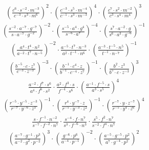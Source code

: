 \begin{align}
\left(\frac{c^{6}\cdot s^{-2}\cdot m^{-3}}{c^{-3}\cdot s^{3}\cdot m^{6}}\right)^{2}\cdot \left(\frac{c^{-3}\cdot s^{5}\cdot m^{-4}}{c^{-1}\cdot s^{3}\cdot m^{-3}}\right)^{4}\cdot \left(\frac{c^{7}\cdot s^{2}\cdot m^{-2}}{c^{3}\cdot s^{4}\cdot m^{4}}\right)^{3}
\end{align}
\begin{align}
\left(\frac{s^{-2}\cdot a^{-7}\cdot g^{-7}}{s\cdot a^{-7}\cdot g^{-2}}\right)^{-2}\cdot \left(\frac{s^{-5}\cdot a^{4}\cdot g^{4}}{s^{-6}\cdot a^{7}}\right)^{-4}\cdot \left(\frac{s^{7}\cdot a^{-2}\cdot g}{s^{6}\cdot a^{3}\cdot g^{-6}}\right)^{-1}
\end{align}
\begin{align}
\left(\frac{a^{4}\cdot t^{4}\cdot n^{2}}{a^{-2}\cdot t^{7}\cdot n^{-5}}\right)^{-2}\cdot \frac{a^{-5}\cdot t^{7}\cdot n^{-3}}{a^{2}\cdot t^{-1}\cdot n^{6}}\cdot \left(\frac{a^{-3}\cdot t^{-5}\cdot n^{5}}{t^{-1}\cdot n^{-7}}\right)^{-1}
\end{align}
\begin{align}
\left(\frac{b^{-5}\cdot c\cdot z^{7}}{c^{-3}\cdot z^{-3}}\right)^{-3}\cdot \left(\frac{b^{-1}\cdot c^{4}\cdot z}{b^{-1}\cdot c^{-4}\cdot z^{7}}\right)^{-1}\cdot \left(\frac{b^{2}\cdot z^{3}}{b^{5}\cdot c\cdot z^{-3}}\right)^{3}
\end{align}
\begin{align}
\frac{a^{-2}\cdot f^{7}\cdot s^{6}}{a^{4}\cdot f^{6}\cdot s^{2}}\cdot \frac{a^{2}\cdot f^{3}\cdot s}{f^{-4}\cdot s^{6}}\cdot \left(\frac{a^{-1}\cdot f^{-5}\cdot s}{a^{3}\cdot s^{5}}\right)^{4}
\end{align}
\begin{align}
\left(\frac{r^{-5}\cdot y^{-5}\cdot z^{-3}}{r^{-7}\cdot y^{-6}\cdot z^{3}}\right)^{-1}\cdot \left(\frac{r^{4}\cdot y^{-7}\cdot z}{r^{-5}\cdot y^{-3}\cdot z^{2}}\right)^{-1}\cdot \left(\frac{r^{-7}\cdot y\cdot z^{-7}}{r^{-5}\cdot y^{4}\cdot z^{6}}\right)^{4}
\end{align}
\begin{align}
\frac{s\cdot f^{-1}\cdot n^{-2}}{s^{-7}\cdot f^{-2}\cdot n^{7}}\cdot \frac{s^{-4}\cdot f\cdot n^{7}}{s^{3}\cdot f^{-6}\cdot n^{3}}\cdot \frac{s^{5}\cdot f^{2}\cdot n^{7}}{s^{-2}\cdot f^{4}\cdot n^{7}}
\end{align}
\begin{align}
\left(\frac{a^{-7}\cdot g^{-1}\cdot p^{3}}{a^{-2}\cdot g^{2}\cdot p^{-2}}\right)^{3}\cdot \left(\frac{g^{-6}\cdot p^{6}}{a^{-4}\cdot p^{-1}}\right)^{-2}\cdot \left(\frac{a^{-5}\cdot g^{-5}\cdot p^{2}}{a^{7}\cdot g^{-4}\cdot p^{2}}\right)^{2}
\end{align}
